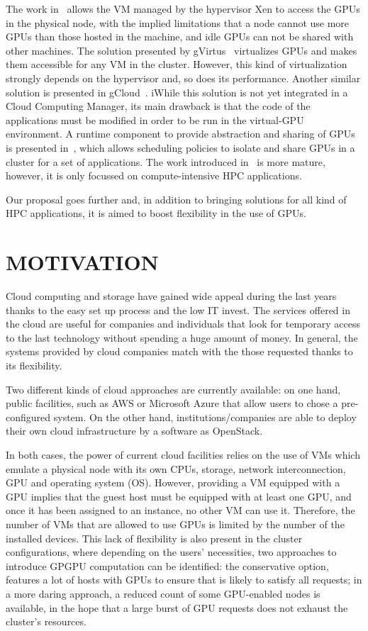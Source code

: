 \documentclass[a4paper,twoside]{article}
\begin{document}
The work in~\cite{younge2013enabling} allows the VM managed
by the hypervisor Xen to access the GPUs in the physical
node, with the implied limitations that a node cannot 
use more GPUs than those hosted in the machine, and idle GPUs can not be shared with other machines. The solution presented 
by gVirtus~\cite{giunta2010gpgpu} virtualizes GPUs and makes
them accessible for any VM in the cluster. However, this kind
of virtualization strongly depends on the hypervisor and, so
does its performance. Another similar solution is presented in gCloud~\cite{diab2013dynamic}. 
iWhile this solution is not yet integrated in a Cloud Computing Manager, its main
drawback is that the code of the applications must be modified
in order to be run in the virtual-GPU environment. A runtime component to provide abstraction
and sharing of GPUs is presented in~\cite{becchi2012virtual}, which allows scheduling policies 
to isolate and share GPUs in a cluster for a set of applications. 
The work introduced in~\cite{jungpgpu} is more mature, however,
it is only focussed on compute-intensive HPC applications. 

Our proposal goes further and, in addition to 
bringing solutions for all kind of HPC applications, it is aimed
to boost flexibility in the use of GPUs.

\section{\uppercase{Motivation}}
\label{sec:motivation}

Cloud computing and storage have gained wide appeal  
during the last years thanks to the easy set up 
process and the low IT invest. The services offered in the cloud are useful for companies and individuals 
that look for temporary access to the last technology without spending a 
huge amount of money. In general, the systems provided by cloud 
companies match with the those requested thanks to its flexibility.

Two different kinds of cloud approaches are currently available:
on one hand, public facilities, such as AWS or 
Microsoft Azure that allow users to chose a pre-configured system.   
On the other hand, institutions/companies 
are able to deploy their own cloud infrastructure by a software as OpenStack.  

In both cases, the power of current cloud facilities relies on the use 
of VMs which  
emulate a physical node with its own 
CPUs, storage, network interconnection, GPU and operating system (OS). 
However, providing a VM equipped with a GPU implies
that the guest host must be equipped with at least one GPU, and
once it has been assigned to an instance, no other VM can use
it. Therefore, the number of VMs that are allowed to use GPUs is 
limited by the number of the installed devices. This lack of 
flexibility is also present in the cluster configurations, where 
depending on the users' necessities, 
two approaches to introduce GPGPU computation can be identified:
the conservative option, features a lot of hosts with GPUs to 
ensure that is likely to satisfy all requests; in a
more daring approach, a reduced count of some GPU-enabled nodes is available, in the hope that a large burst of GPU requests 
 does not exhaust the cluster's resources.
\end{document}
